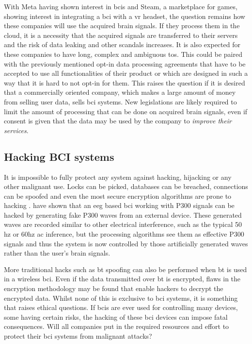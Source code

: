 With Meta having shown interest in \glspl{bci} and Steam, a marketplace for games, showing interest in integrating a \gls{bci} with a \gls{vr} headset, the question remains how these companies will use the acquired brain signals.
If they process them in the cloud, it is a necessity that the acquired signals are transferred to their servers and the risk of data leaking and other scandals increases.
It is also expected for these companies to have long, complex and ambiguous \gls{tos}.
This could be paired with the previously mentioned opt-in data processing agreements that have to be accepted to use all functionalities of their product or which are designed in such a way that it is hard to not opt-in for them.
This raises the question if it is desired that a commercially oriented company, which makes a large amount of money from selling user data, sells \gls{bci} systems.
New legislations are likely required to limit the amount of processing that can be done on acquired brain signals, even if consent is given that the data may be used by the company to \textit{improve their services}.



\subsection{Hacking BCI systems}
\label{subsec:bci_ethical_hacking}

It is impossible to fully protect any system against hacking, hijacking or any other malignant use.
Locks can be picked, databases can be breached,  connections can be spoofed and even the most secure encryption algorithms are prone to hacking \citep{quantum_hacking}.
 have shown that an \gls{eeg} based \gls{bci} working with P300 signals can be hacked by generating fake P300 waves from an external device.
These generated waves are recorded similar to other electrical interference, such as the typical 50 \gls{hz} or 60\gls{hz} \gls{ac} inference, but the processing algorithms see them as effective P300 signals and thus the system is now controlled by those artificially generated waves rather than the user's brain signals.

More traditional hacks such as \gls{bt} spoofing can also be performed when \gls{bt} is used in a wireless \gls{bci}.
Even if the data transmitted over \gls{bt} is encrypted, flaws in the encryption methodology may be found that enable hackers to decrypt the encrypted data.
Whilst none of this is exclusive to \gls{bci} systems, it is something that raises ethical questions.
If \glspl{bci} are ever used for controlling many devices, some having certain risks, the hacking of these \gls{bci} devices can impose fatal consequences.
Will all companies put in the required resources and effort to protect their \gls{bci} systems from malignant attacks?

